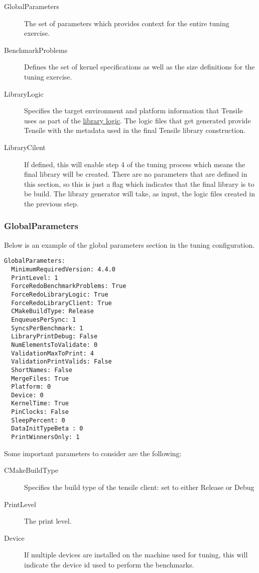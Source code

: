 \documentclass[]{article}
\begin{document}
\begin{description}
\item[GlobalParameters] The set of parameters which provides context for the entire tuning exercise. 
\item[BenchmarkProblems] Defines the set of kernel specifications as well as the size definitions for the tuning exercise.
\item[LibraryLogic] Specifies the target environment and platform information that Tensile uses as part of the \hyperref[sec:LibraryLogic]{library logic}. The logic files that get generated provide Tensile with the metadata used in the final Tensile library construction.
\item[LibraryCilent] If defined, this will enable step 4 of the tuning process which means the final library will be created. There are no parameters that are defined in this section, so this is just a flag which indicates that the final library is to be build. The library generator will take, as input, the logic files created in the previous step.
\end{description}

\subsubsection{GlobalParameters}

Below is an example of the global parameters section in the tuning configuration.

\begin{verbatim}
GlobalParameters:
  MinimumRequiredVersion: 4.4.0
  PrintLevel: 1
  ForceRedoBenchmarkProblems: True
  ForceRedoLibraryLogic: True
  ForceRedoLibraryClient: True
  CMakeBuildType: Release
  EnqueuesPerSync: 1
  SyncsPerBenchmark: 1
  LibraryPrintDebug: False
  NumElementsToValidate: 0
  ValidationMaxToPrint: 4
  ValidationPrintValids: False
  ShortNames: False
  MergeFiles: True
  Platform: 0
  Device: 0
  KernelTime: True
  PinClocks: False
  SleepPercent: 0
  DataInitTypeBeta : 0
  PrintWinnersOnly: 1
\end{verbatim}

\noindent
Some important parameters to consider are the following:
\begin{description}
\item[CMakeBuildType] Specifies the build type of the tensile client: set to either Release or Debug
\item[PrintLevel] The print level.
\item[Device] If multiple devices are installed on the machine used for tuning, this will indicate the device id used to perform the benchmarks.
\end{description}
\end{document}
